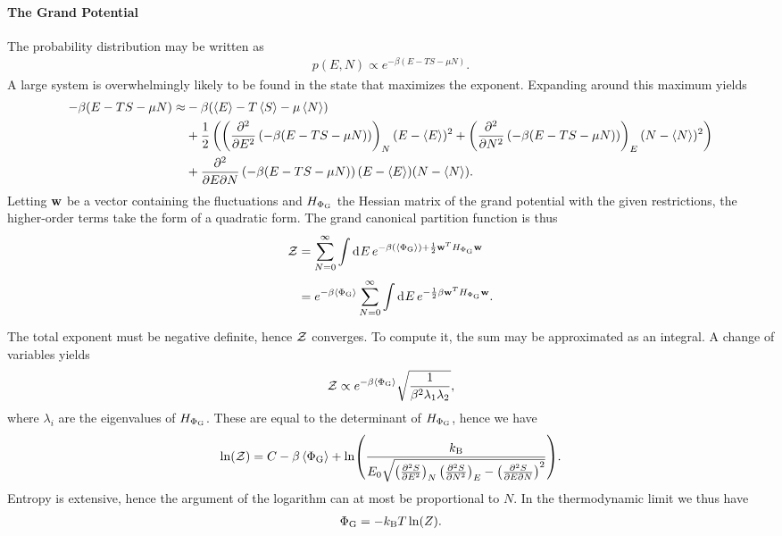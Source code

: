 \paragraph{The Grand Potential}
The probability distribution may be written as
\begin{align*}
	p(E, N) \propto e^{-\beta(E - TS - \mu N)}.
\end{align*}
A large system is overwhelmingly likely to be found in the state that maximizes the exponent. Expanding around this maximum yields
\begin{align*}
	-\beta(E - TS - \mu N) \approx& -\beta(\expval{E} - T\expval{S} - \mu \expval{N}) \\
	                              &+ \frac{1}{2}\left(\left(\pdv[2]{E}\left(-\beta(E - TS - \mu N)\right)\right)_{N}(E - \expval{E})^{2} +  \left(\pdv[2]{N}\left(-\beta(E - TS - \mu N)\right)\right)_{E}(N - \expval{N})^{2}\right) \\
	                              &+ \pdv{}{E}{N}\left(-\beta(E - TS - \mu N)\right)(E - \expval{E})(N - \expval{N}).
\end{align*}
Letting $\vb{w}$ be a vector containing the fluctuations and $H_{\Phi_{\text{G}}}$ the Hessian matrix of the grand potential with the given restrictions, the higher-order terms take the form of a quadratic form. The grand canonical partition function is thus
\begin{align*}
	\mathcal{Z} &= \sum\limits_{N = 0}^{\infty}\int\limits_{}^{}\dd[]{E}e^{-\beta(\expval{\Phi_{\text{G}}}) + \frac{1}{2}\vb{w}^{T}H_{\Phi_{\text{G}}}\vb{w}} \\
	   &= e^{-\beta\expval{\Phi_{\text{G}}}}\sum\limits_{N = 0}^{\infty}\int\limits_{}^{}\dd[]{E}e^{-\frac{1}{2}\beta\vb{w}^{T}H_{\Phi_{\text{G}}}\vb{w}}.
\end{align*}
The total exponent must be negative definite, hence $\mathcal{Z}$ converges. To compute it, the sum may be approximated as an integral. A change of variables yields
\begin{align*}
	\mathcal{Z} \propto e^{-\beta\expval{\Phi_{\text{G}}}}\sqrt{\frac{1}{\beta^{2}\lambda_{1}\lambda_{2}}},
\end{align*}
where $\lambda_{i}$ are the eigenvalues of $H_{\Phi_{\text{G}}}$. These are equal to the determinant of $H_{\Phi_{\text{G}}}$, hence we have
\begin{align*}
	\ln(\mathcal{Z}) = C - \beta\expval{\Phi_{\text{G}}} + \ln(\frac{k_{\text{B}}}{E_{0}\sqrt{\left(\pdv[2]{S}{E}\right)_{N}\left(\pdv[2]{S}{N}\right)_{E} - \left(\pdv{S}{E}{N}\right)^{2}}}).
\end{align*}
Entropy is extensive, hence the argument of the logarithm can at most be proportional to $N$. In the thermodynamic limit we thus have
\begin{align*}
	\Phi_{\text{G}} = -k_{\text{B}} T\ln(Z).
\end{align*}

